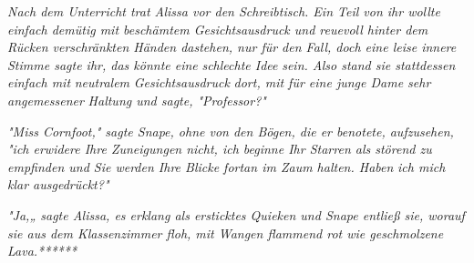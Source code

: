 {\emph{Nach dem Unterricht trat Alissa vor den Schreibtisch. Ein Teil von ihr wollte einfach demütig mit beschämtem Gesichtsausdruck und reuevoll hinter dem Rücken verschränkten Händen dastehen, nur für den Fall, doch eine leise innere Stimme sagte ihr, das könnte eine} \emph{\emph{schlechte Idee}} \emph{sein. Also stand sie stattdessen einfach mit} \emph{neutralem} \emph{Gesichtsausdruck} \emph{dort, mit für eine junge Dame sehr angemessener} \emph{Haltung und sagte, "Professor?"}

\emph{"Miss Cornfoot," sagte Snape, ohne von den Bögen, die er benotete, aufzusehen, "ich erwidere Ihre Zuneigungen nicht, ich beginne Ihr Starren als störend zu empfinden und Sie werden Ihre Blicke fortan im Zaum halten. Haben} \emph{ich mich klar ausgedrückt?"}

\emph{"Ja,„ sagte Alissa, es erklang als ersticktes Quieken und Snape entließ sie, worauf sie aus dem Klassenzimmer floh, mit Wangen flammend rot wie geschmolzene Lava.******}

}
